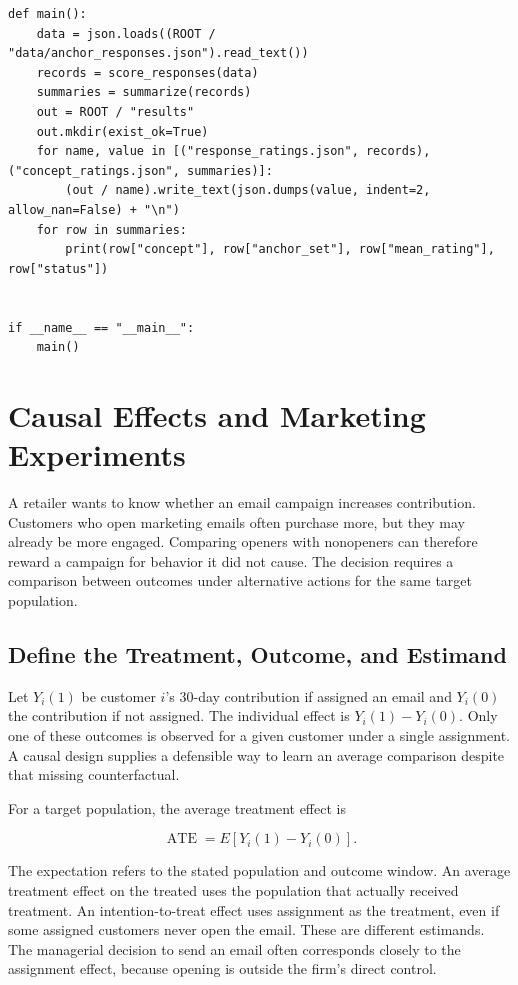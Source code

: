 \begin{Verbatim}[breaklines,breakanywhere,fontsize=\small]
def main():
    data = json.loads((ROOT / "data/anchor_responses.json").read_text())
    records = score_responses(data)
    summaries = summarize(records)
    out = ROOT / "results"
    out.mkdir(exist_ok=True)
    for name, value in [("response_ratings.json", records), ("concept_ratings.json", summaries)]:
        (out / name).write_text(json.dumps(value, indent=2, allow_nan=False) + "\n")
    for row in summaries:
        print(row["concept"], row["anchor_set"], row["mean_rating"], row["status"])


if __name__ == "__main__":
    main()
\end{Verbatim}

\hypertarget{M06-m6.-causal-effects-and-marketing-experiments}{%
\chapter{Causal Effects and Marketing
Experiments}\label{M06-m6.-causal-effects-and-marketing-experiments}}

\noindent A retailer wants to know whether an email campaign increases
contribution. Customers who open marketing emails often purchase more,
but they may already be more engaged. Comparing openers with nonopeners
can therefore reward a campaign for behavior it did not cause. The
decision requires a comparison between outcomes under alternative
actions for the same target population.

\hypertarget{M06-define-the-treatment-outcome-and-estimand}{%
\section{Define the Treatment, Outcome, and
Estimand}\label{M06-define-the-treatment-outcome-and-estimand}}

\noindent Let \(Y_i(1)\) be customer \(i\)'s 30-day contribution if assigned an
email and \(Y_i(0)\) the contribution if not assigned. The individual
effect is \(Y_i(1)-Y_i(0)\). Only one of these outcomes is observed for
a given customer under a single assignment. A causal design supplies a
defensible way to learn an average comparison despite that missing
counterfactual.

For a target population, the average treatment effect is

\[
\operatorname{ATE}=E[Y_i(1)-Y_i(0)].
\]

The expectation refers to the stated population and outcome window. An
average treatment effect on the treated uses the population that
actually received treatment. An intention-to-treat effect uses
assignment as the treatment, even if some assigned customers never open
the email. These are different estimands. The managerial decision to
send an email often corresponds closely to the assignment effect,
because opening is outside the firm's direct control.

